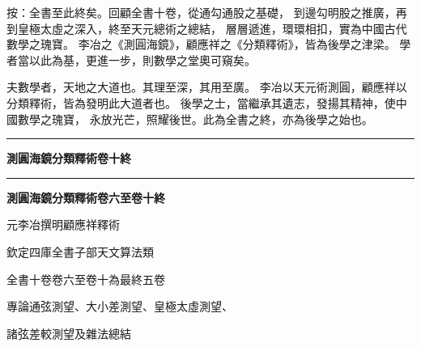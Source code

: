 \documentclass[12pt,a4paper]{article}
\begin{document}
\noindent
按：全書至此終矣。回顧全書十卷，從通勾通股之基礎，
到邊勾明股之推廣，再到皇極太虛之深入，終至天元總術之總結，
層層遞進，環環相扣，實為中國古代數學之瑰寶。
李冶之《測圓海鏡》，顧應祥之《分類釋術》，皆為後學之津梁。
學者當以此為基，更進一步，則數學之堂奧可窺矣。

\vspace{0.3em}

\noindent
夫數學者，天地之大道也。其理至深，其用至廣。
李冶以天元術測圓，顧應祥以分類釋術，皆為發明此大道者也。
後學之士，當繼承其遺志，發揚其精神，使中國數學之瑰寶，
永放光芒，照耀後世。此為全書之終，亦為後學之始也。

\vspace{1em}
\begin{center}
\rule{0.5\textwidth}{0.4pt}

\textbf{測圓海鏡分類釋術卷十終}
\end{center}

\vspace{2em}
\begin{center}
\rule{0.6\textwidth}{0.5pt}

\textbf{測圓海鏡分類釋術卷六至卷十終}

\vspace{0.5em}

{\small 元李冶撰\quad 明顧應祥釋術}

\vspace{0.5em}

{\small 欽定四庫全書\quad 子部\quad 天文算法類}

\vspace{0.5em}

{\small 全書十卷\quad 卷六至卷十為最終五卷}

{\small 專論通弦測望、大小差測望、皇極太虛測望、}

{\small 諸弦差較測望及雜法總結}
\end{center}
\end{document}
